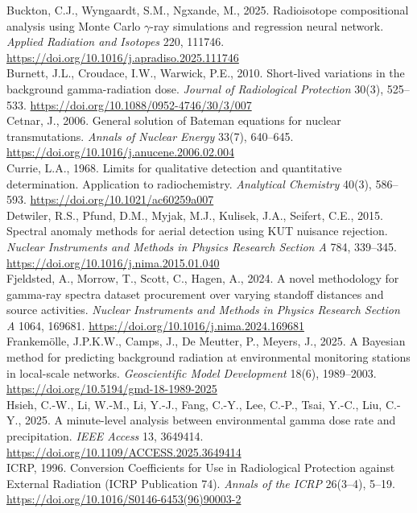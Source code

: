 \documentclass[11pt,a4paper]{article}
\begin{document}
\begin{framed}
\noindent Buckton, C.J., Wyngaardt, S.M., Ngxande, M., 2025. Radioisotope compositional analysis using Monte Carlo $\gamma$-ray simulations and regression neural network. \textit{Applied Radiation and Isotopes} 220, 111746. \url{https://doi.org/10.1016/j.apradiso.2025.111746}\\[0.5em]
\noindent Burnett, J.L., Croudace, I.W., Warwick, P.E., 2010. Short-lived variations in the background gamma-radiation dose. \textit{Journal of Radiological Protection} 30(3), 525--533. \url{https://doi.org/10.1088/0952-4746/30/3/007}\\[0.5em]
\noindent Cetnar, J., 2006. General solution of Bateman equations for nuclear transmutations. \textit{Annals of Nuclear Energy} 33(7), 640--645. \url{https://doi.org/10.1016/j.anucene.2006.02.004}\\[0.5em]
\noindent Currie, L.A., 1968. Limits for qualitative detection and quantitative determination. Application to radiochemistry. \textit{Analytical Chemistry} 40(3), 586--593. \url{https://doi.org/10.1021/ac60259a007}\\[0.5em]
\noindent Detwiler, R.S., Pfund, D.M., Myjak, M.J., Kulisek, J.A., Seifert, C.E., 2015. Spectral anomaly methods for aerial detection using KUT nuisance rejection. \textit{Nuclear Instruments and Methods in Physics Research Section A} 784, 339--345. \url{https://doi.org/10.1016/j.nima.2015.01.040}\\[0.5em]
\noindent Fjeldsted, A., Morrow, T., Scott, C., Hagen, A., 2024. A novel methodology for gamma-ray spectra dataset procurement over varying standoff distances and source activities. \textit{Nuclear Instruments and Methods in Physics Research Section A} 1064, 169681. \url{https://doi.org/10.1016/j.nima.2024.169681}\\[0.5em]
\noindent Frankemölle, J.P.K.W., Camps, J., De Meutter, P., Meyers, J., 2025. A Bayesian method for predicting background radiation at environmental monitoring stations in local-scale networks. \textit{Geoscientific Model Development} 18(6), 1989--2003. \url{https://doi.org/10.5194/gmd-18-1989-2025}\\[0.5em]
\noindent Hsieh, C.-W., Li, W.-M., Li, Y.-J., Fang, C.-Y., Lee, C.-P., Tsai, Y.-C., Liu, C.-Y., 2025. A minute-level analysis between environmental gamma dose rate and precipitation. \textit{IEEE Access} 13, 3649414. \url{https://doi.org/10.1109/ACCESS.2025.3649414}\\[0.5em]
\noindent ICRP, 1996. Conversion Coefficients for Use in Radiological Protection against External Radiation (ICRP Publication 74). \textit{Annals of the ICRP} 26(3--4), 5--19. \url{https://doi.org/10.1016/S0146-6453(96)90003-2}\\[0.5em]

\end{framed}
\end{document}
